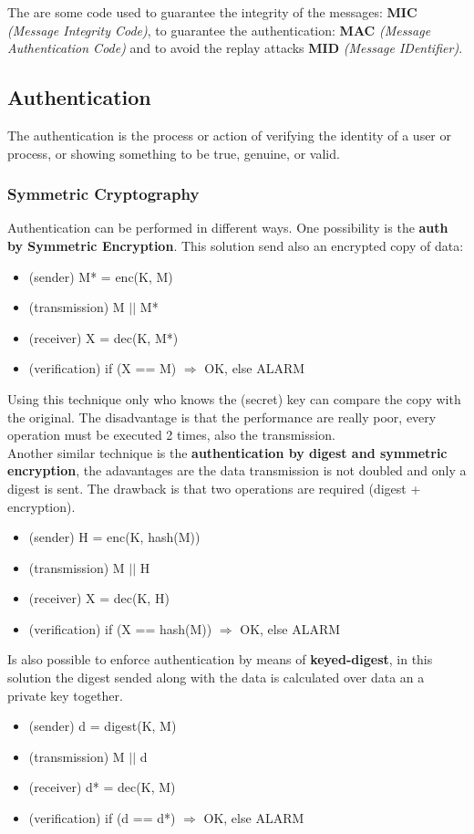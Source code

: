 \documentclass[12pt]{article}
\begin{document}
The are some code used to guarantee the integrity of the messages: \textbf{MIC} \textit{(Message Integrity Code)}, to guarantee the authentication: \textbf{MAC} \textit{(Message Authentication Code)} and to avoid the replay attacks \textbf{MID} \textit{(Message IDentifier)}.

\subsection{Authentication}
The authentication is the process or action of verifying the identity of a user or process, or showing something to be true, genuine, or valid.
\subsubsection{Symmetric Cryptography}
Authentication can be performed in different ways. One possibility is the \textbf{auth by Symmetric Encryption}. This solution send also an encrypted copy of data:
\begin{itemize}
  \item (sender) M* = enc(K, M)
  \item (transmission) M $||$ M*
  \item (receiver) X = dec(K, M*)
  \item (verification) if (X == M) $\Rightarrow$ OK, else ALARM
\end{itemize}
Using this technique only who knows the (secret) key can compare the copy with the original. The disadvantage is that the performance are really poor, every operation must be executed 2 times, also the transmission.\\
Another similar technique is the \textbf{authentication by digest and symmetric encryption}, the adavantages are the data transmission is not doubled and only a digest is sent. The drawback is that two operations are required (digest + encryption).
\begin{itemize}
  \item (sender) H = enc(K, hash(M))
  \item (transmission) M $||$ H
  \item (receiver) X = dec(K, H)
  \item (verification) if (X == hash(M)) $\Rightarrow$ OK, else ALARM
\end{itemize}
Is also possible to enforce authentication by means of \textbf{keyed-digest}, in this solution the digest sended along with the data is calculated over data an a private key together.
\begin{itemize}
  \item (sender) d = digest(K, M)
  \item (transmission) M $||$ d
  \item (receiver) d* = dec(K, M)
  \item (verification) if (d == d*) $\Rightarrow$ OK, else ALARM
\end{itemize}
\end{document}
